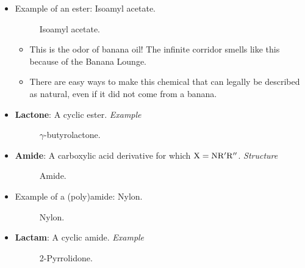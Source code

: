 \documentclass[../notes.tex]{subfiles}
\begin{document}
\begin{itemize}
\begin{itemize}
    \end{itemize}
    \item Example of an ester: Isoamyl acetate.
    \begin{figure}[h!]
        \centering
        \footnotesize
        \caption{Isoamyl acetate.}
        \label{fig:isoamylAcetate}
    \end{figure}
    \begin{itemize}
        \item This is the odor of banana oil! The infinite corridor smells like this because of the Banana Lounge.
        \item There are easy ways to make this chemical that can legally be described as natural, even if it did not come from a banana.
    \end{itemize}
    \pagebreak
    \item \textbf{Lactone}: A cyclic ester. \emph{Example}
    \begin{figure}[h!]
        \centering
        \footnotesize
        \caption{$\gamma$-butyrolactone.}
        \label{fig:carbLactone}
    \end{figure}
    \item \textbf{Amide}: A carboxylic acid derivative for which $\ce{X}=\ce{NR$'$R$''$}$. \emph{Structure}
    \begin{figure}[h!]
        \centering
        \footnotesize
        \caption{Amide.}
        \label{fig:carbAmide}
    \end{figure}
    \item Example of a (poly)amide: Nylon.
    \begin{figure}[h!]
        \centering
        \footnotesize
        \caption{Nylon.}
        \label{fig:nylon}
    \end{figure}
    \item \textbf{Lactam}: A cyclic amide. \emph{Example}
    \begin{figure}[h!]
        \centering
        \footnotesize
        \caption{2-Pyrrolidone.}
        \label{fig:carbLactam}
    \end{figure}
    \begin{itemize}

\end{itemize}
\end{itemize}
\end{document}
